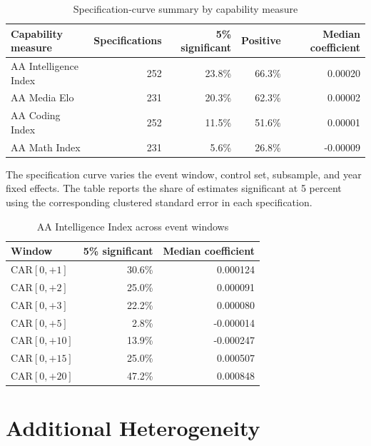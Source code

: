 \documentclass[12pt]{article}
\begin{document}
\begin{table}[htbp]
\centering
\caption{Specification-curve summary by capability measure}
\label{tab:a_specr_metrics}
\begin{threeparttable}
\begin{tabular}{lrrrr}
\toprule
Capability measure & Specifications & 5\% significant & Positive & Median coefficient \\
\midrule
AA Intelligence Index & 252 & 23.8\% & 66.3\% & 0.00020 \\
AA Media Elo & 231 & 20.3\% & 62.3\% & 0.00002 \\
AA Coding Index & 252 & 11.5\% & 51.6\% & 0.00001 \\
AA Math Index & 231 & 5.6\% & 26.8\% & -0.00009 \\
\bottomrule
\end{tabular}
\begin{tablenotes}[flushleft]\footnotesize
\item The specification curve varies the event window, control set, subsample,
and year fixed effects. The table reports the share of estimates significant at
5 percent using the corresponding clustered standard error in each specification.
\end{tablenotes}
\end{threeparttable}
\end{table}

\begin{table}[htbp]
\centering
\caption{AA Intelligence Index across event windows}
\label{tab:a_windows}
\begin{tabular}{lrr}
\toprule
Window & 5\% significant & Median coefficient \\
\midrule
CAR$[0,{+}1]$ & 30.6\% & 0.000124 \\
CAR$[0,{+}2]$ & 25.0\% & 0.000091 \\
CAR$[0,{+}3]$ & 22.2\% & 0.000080 \\
CAR$[0,{+}5]$ & 2.8\% & -0.000014 \\
CAR$[0,{+}10]$ & 13.9\% & -0.000247 \\
CAR$[0,{+}15]$ & 25.0\% & 0.000507 \\
CAR$[0,{+}20]$ & 47.2\% & 0.000848 \\
\bottomrule
\end{tabular}
\end{table}

\section{Additional Heterogeneity}
\label{app:heterogeneity}
\end{document}
